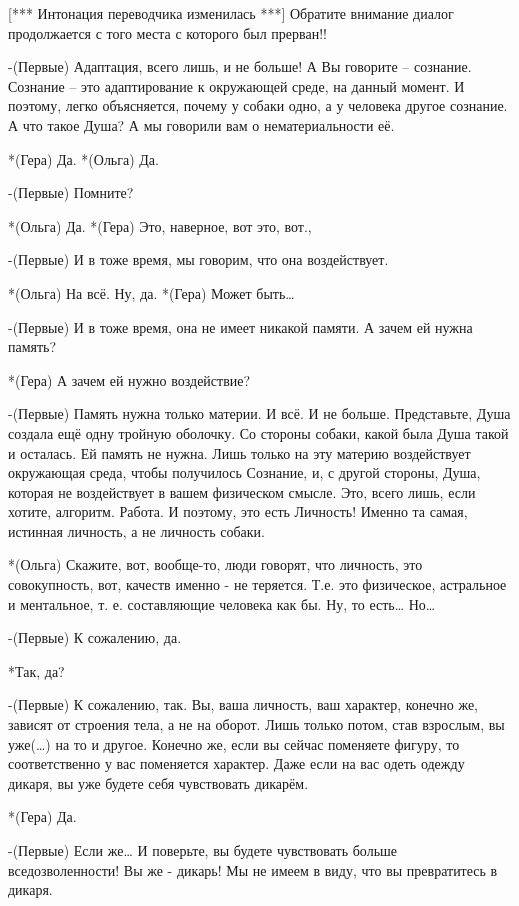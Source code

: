 [*** Интонация переводчика изменилась ***]
Обратите внимание диалог продолжается с того места с которого был прерван!!

-(Первые) Адаптация, всего лишь, и не больше! А Вы говорите – сознание. Сознание – это  адаптирование к окружающей среде, на данный момент. И поэтому, легко объясняется, почему у собаки одно, а у человека другое сознание. А что такое Душа? А мы говорили вам о нематериальности её.

*(Гера) Да.
*(Ольга) Да.

-(Первые) Помните?

*(Ольга) Да.
*(Гера) Это, наверное, вот это, вот.,

-(Первые) И в тоже время, мы говорим, что она воздействует.

*(Ольга) На всё. Ну, да.
*(Гера) Может быть…

-(Первые) И в тоже время, она не имеет никакой памяти. А зачем ей нужна память?

*(Гера) А зачем ей нужно воздействие?

-(Первые) Память нужна только материи. И всё. И не больше. Представьте, Душа создала ещё одну тройную оболочку. Со стороны собаки, какой была Душа такой и осталась. Ей память не нужна. Лишь только на эту материю воздействует окружающая среда, чтобы получилось Сознание, и, с другой стороны, Душа, которая не воздействует в вашем физическом смысле. Это, всего лишь, если хотите, алгоритм. Работа. И поэтому, это есть Личность! Именно та самая, истинная личность, а не личность собаки.

*(Ольга) Скажите, вот, вообще-то, люди говорят, что личность, это совокупность, вот, качеств именно - не теряется. Т.е. это физическое, астральное и ментальное, т. е. составляющие человека как бы. Ну, то есть… Но…

-(Первые) К сожалению, да. 

*Так, да?

-(Первые) К сожалению, так. Вы, ваша личность, ваш характер, конечно же, зависят от строения тела, а не на оборот. Лишь только потом, став взрослым, вы уже(…) на то и другое. Конечно же, если вы сейчас поменяете фигуру, то соответственно у вас поменяется характер. Даже если на вас одеть одежду дикаря, вы уже будете себя чувствовать дикарём.

*(Гера) Да. 

-(Первые) Если же… И поверьте, вы будете чувствовать больше вседозволенности! Вы же - дикарь! Мы не имеем в виду, что вы превратитесь в дикаря.

